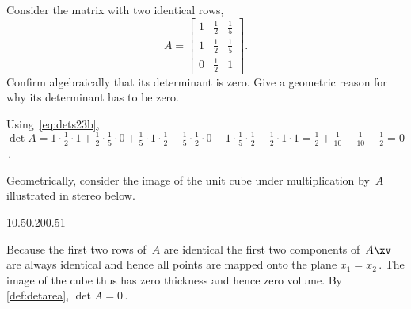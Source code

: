 \begin{example} \label{eg:}
Consider the matrix with two identical rows,
\begin{equation*}
A=\begin{bmatrix} 1&\frac12&\frac15
\\1&\frac12&\frac15
\\0&\frac12&1 \end{bmatrix}.
\end{equation*}
Confirm algebraically that its determinant is zero.
Give a geometric reason for why its determinant has to be zero.

\begin{solution} 
Using~\eqref{eq:dets23b}, \(\det A =1\cdot\frac12\cdot1 +\frac12\cdot\frac15\cdot0 +\frac15\cdot1\cdot\frac12
-\frac15\cdot\frac12\cdot0 -1\cdot\frac15\cdot\frac12 -\frac12\cdot1\cdot1 =\frac12+\frac1{10}-\frac1{10}-\frac12=0\)\,.

Geometrically, consider the image of the unit cube under multiplication by~\(A\) illustrated in stereo below. 
\begin{center}
1{0.5}{0.2}{0}{0.5}1
\end{center}
Because the first two rows of~\(A\) are identical the first two components of~\(A\xv\) are always identical and hence all points are mapped onto the plane \(x_1=x_2\)\,.  
The image of the cube thus has zero thickness and hence zero volume.
By \autoref{def:detarea}, \(\det A=0\)\,.
\end{solution}
\end{example}




